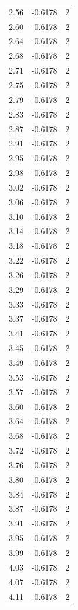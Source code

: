 \begin{longtable}{lrr}
  2.56 & -0.6178 & 2 \\
  2.60 & -0.6178 & 2 \\
  2.64 & -0.6178 & 2 \\
  2.68 & -0.6178 & 2 \\
  2.71 & -0.6178 & 2 \\
  2.75 & -0.6178 & 2 \\
  2.79 & -0.6178 & 2 \\
  2.83 & -0.6178 & 2 \\
  2.87 & -0.6178 & 2 \\
  2.91 & -0.6178 & 2 \\
  2.95 & -0.6178 & 2 \\
  2.98 & -0.6178 & 2 \\
  3.02 & -0.6178 & 2 \\
  3.06 & -0.6178 & 2 \\
  3.10 & -0.6178 & 2 \\
  3.14 & -0.6178 & 2 \\
  3.18 & -0.6178 & 2 \\
  3.22 & -0.6178 & 2 \\
  3.26 & -0.6178 & 2 \\
  3.29 & -0.6178 & 2 \\
  3.33 & -0.6178 & 2 \\
  3.37 & -0.6178 & 2 \\
  3.41 & -0.6178 & 2 \\
  3.45 & -0.6178 & 2 \\
  3.49 & -0.6178 & 2 \\
  3.53 & -0.6178 & 2 \\
  3.57 & -0.6178 & 2 \\
  3.60 & -0.6178 & 2 \\
  3.64 & -0.6178 & 2 \\
  3.68 & -0.6178 & 2 \\
  3.72 & -0.6178 & 2 \\
  3.76 & -0.6178 & 2 \\
  3.80 & -0.6178 & 2 \\
  3.84 & -0.6178 & 2 \\
  3.87 & -0.6178 & 2 \\
  3.91 & -0.6178 & 2 \\
  3.95 & -0.6178 & 2 \\
  3.99 & -0.6178 & 2 \\
  4.03 & -0.6178 & 2 \\
  4.07 & -0.6178 & 2 \\
  4.11 & -0.6178 & 2 \\

\end{longtable}
